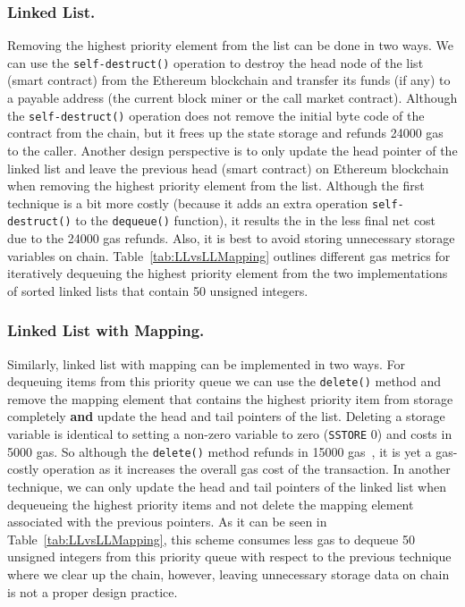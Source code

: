 
\subsubsection*{Linked List.} Removing the highest priority element from the list can be done in two ways. We can use the \texttt{self-destruct()} operation to destroy the head node of the list (\ie smart contract) from the Ethereum blockchain and transfer its funds (if any) to a payable address (\eg the current block miner or the call market contract). Although the \texttt{self-destruct()} operation does not remove the initial byte code of the contract from the chain, but it frees up the state storage and refunds 24000 gas to the caller. Another design perspective is to only update the head pointer of the linked list and leave the previous head (\ie smart contract) on Ethereum blockchain when removing the highest priority element from the list. Although the first technique is a bit more costly (because it adds an extra operation \texttt{self-destruct()} to the \texttt{dequeue()} function), it results the in the less final net cost due to the 24000 gas refunds. Also, it is best to avoid storing unnecessary storage variables on chain. Table~\ref{tab:LLvsLLMapping} outlines different gas metrics for iteratively dequeuing the highest priority element from the two implementations of sorted linked lists that contain 50 unsigned integers.


\subsubsection*{Linked List with Mapping.} Similarly, linked list with mapping can be implemented in two ways. For dequeuing items from this priority queue we can use the \texttt{delete()} method and remove the mapping element that contains the highest priority item from storage completely  \textbf{and} update the head and tail pointers of the list. Deleting a storage variable is identical to setting a non-zero variable to zero (\texttt{SSTORE} 0) and costs in 5000 gas. So although the \texttt{delete()} method refunds in 15000 gas~\cite{wood2014ethereum}, it is yet a gas-costly operation  as it increases the overall gas cost of the transaction. In another technique, we can only update the head and tail pointers of the linked list when dequeueing the highest priority items and not delete the mapping element associated with the previous pointers. As it can be seen in Table~\ref{tab:LLvsLLMapping}, this scheme consumes less gas to dequeue 50 unsigned integers from this priority queue with respect to the previous technique where we clear up the chain, however, leaving unnecessary storage data on chain is not a proper design practice.



